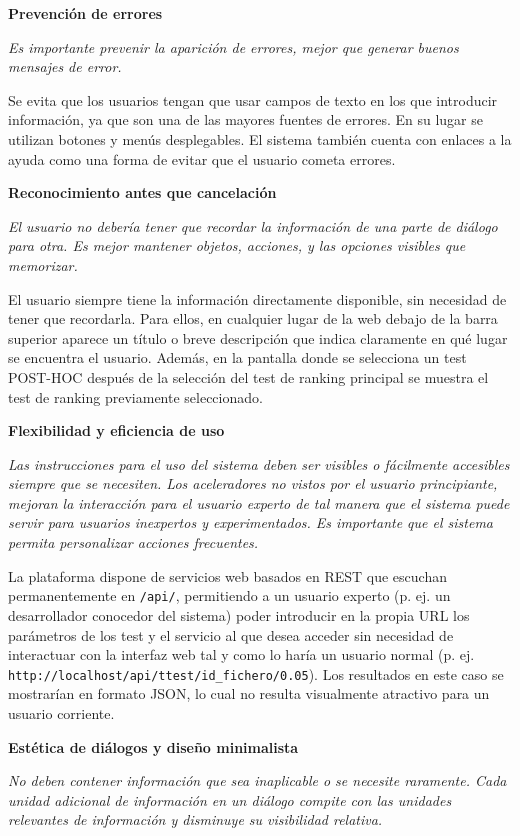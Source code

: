 \noindent
\textbf{Prevención de errores}

\textit{Es importante prevenir la aparición de errores, mejor que generar buenos mensajes de error.}

Se evita que los usuarios tengan que usar campos de texto en los que introducir información, ya que son una de las mayores fuentes de errores. En su lugar se utilizan botones y menús desplegables. El sistema también cuenta con enlaces a la ayuda como una forma de evitar que el usuario cometa errores.

\noindent
\textbf{Reconocimiento antes que cancelación}

\textit{El usuario no debería tener que recordar la información de una parte de diálogo para otra. Es mejor mantener objetos, acciones, y las opciones visibles que memorizar.}

El usuario siempre tiene la información directamente disponible, sin necesidad de tener que recordarla. Para ellos, en cualquier lugar de la web debajo de la barra superior aparece un título o breve descripción que indica claramente en qué lugar se encuentra el usuario. Además, en la pantalla donde se selecciona un test POST-HOC después de la selección del test de ranking principal se muestra el test de ranking previamente seleccionado.

\noindent
\textbf{Flexibilidad y eficiencia de uso}

\textit{Las instrucciones para el uso del sistema deben ser visibles o fácilmente accesibles siempre que se necesiten. Los aceleradores no vistos por el usuario principiante, mejoran la interacción para el usuario experto de tal manera que el sistema puede servir para usuarios inexpertos y experimentados. Es importante que el sistema permita personalizar acciones frecuentes.}

La plataforma dispone de servicios web basados en REST que escuchan permanentemente en \texttt{/api/}, permitiendo a un usuario experto (p. ej. un desarrollador conocedor del sistema) poder introducir en la propia URL los parámetros de los test y el servicio al que desea acceder sin necesidad de interactuar con la interfaz web tal y como lo haría un usuario normal (p. ej. \texttt{http://localhost/api/ttest/id\_fichero/0.05}). Los resultados en este caso se mostrarían en formato JSON, lo cual no resulta visualmente atractivo para un usuario corriente.

\noindent
\textbf{Estética de diálogos y diseño minimalista}

\textit{No deben contener información que sea inaplicable o se necesite raramente. Cada unidad adicional de información en un diálogo compite con las unidades relevantes de información y disminuye su visibilidad relativa.}

